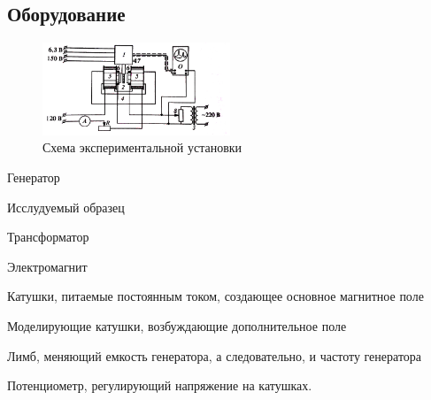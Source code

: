 \subsection*{Оборудование}


\begin{figure}[h]
    \centering
    \includegraphics[width=0.5\textwidth]{lab.png}
    \caption{Схема экспериментальной установки}
\end{figure}


\begin{enumerate*}
    \item Генератор
    \item Исслудуемый образец
    \item Трансформатор
    \item Электромагнит
    \item Катушки, питаемые постоянным током, создающее основное магнитное поле
    \item Моделирующие катушки, возбуждающие дополнительное поле
    \item Лимб, меняющий емкость генератора, а следовательно, и частоту генератора
    \item Потенциометр, регулирующий напряжение на катушках.
\end{enumerate*}